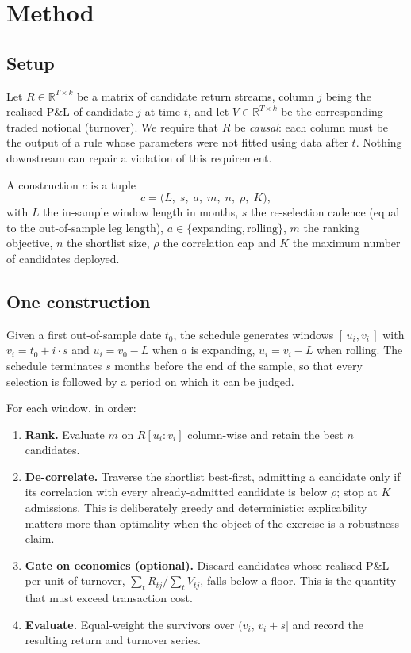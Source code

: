 \documentclass[11pt,a4paper]{article}
\begin{document}
\section{Method}

\subsection{Setup}

Let $R \in \mathbb{R}^{T \times k}$ be a matrix of candidate return streams,
column $j$ being the realised P\&L of candidate $j$ at time $t$, and let
$V \in \mathbb{R}^{T \times k}$ be the corresponding traded notional
(turnover). We require that $R$ be \emph{causal}: each column must be the
output of a rule whose parameters were not fitted using data after $t$. Nothing
downstream can repair a violation of this requirement.

A construction $c$ is a tuple
\[
c = \big(L,\; s,\; a,\; m,\; n,\; \rho,\; K\big),
\]
with $L$ the in-sample window length in months, $s$ the re-selection cadence
(equal to the out-of-sample leg length), $a \in \{\text{expanding},
\text{rolling}\}$, $m$ the ranking objective, $n$ the shortlist size, $\rho$ the
correlation cap and $K$ the maximum number of candidates deployed.

\subsection{One construction}

Given a first out-of-sample date $t_0$, the schedule generates windows
$[\,u_i, v_i\,]$ with $v_i = t_0 + i\cdot s$ and $u_i = v_0 - L$ when $a$ is
expanding, $u_i = v_i - L$ when rolling. The schedule terminates $s$ months
before the end of the sample, so that every selection is followed by a period
on which it can be judged.

For each window, in order:

\begin{enumerate}[leftmargin=1.5em,itemsep=1pt,topsep=3pt]
  \item \textbf{Rank.} Evaluate $m$ on $R[u_i{:}v_i]$ column-wise and retain the
        best $n$ candidates.
  \item \textbf{De-correlate.} Traverse the shortlist best-first, admitting a
        candidate only if its correlation with every already-admitted candidate
        is below $\rho$; stop at $K$ admissions. This is deliberately greedy and
        deterministic: explicability matters more than optimality when the
        object of the exercise is a robustness claim.
  \item \textbf{Gate on economics (optional).} Discard candidates whose realised
        P\&L per unit of turnover, $\sum_t R_{tj} / \sum_t V_{tj}$, falls below
        a floor. This is the quantity that must exceed transaction cost.
  \item \textbf{Evaluate.} Equal-weight the survivors over
        $(v_i, \, v_i + s]$ and record the resulting return and turnover series.
\end{enumerate}
\end{document}
